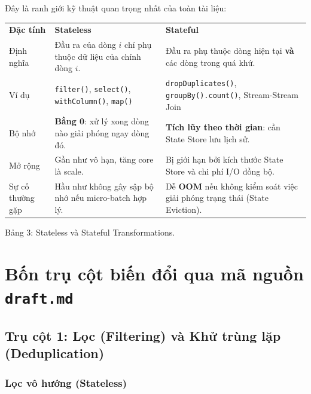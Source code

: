 \documentclass[12pt]{article}
\begin{document}
Đây là ranh giới kỹ thuật quan trọng nhất của toàn tài liệu:

\noindent
\begin{longtable}{@{}>{\RaggedRight\arraybackslash}p{2.8cm}>{\RaggedRight\arraybackslash}p{6.4cm}>{\RaggedRight\arraybackslash}p{6.4cm}@{}}
\rowcolor{rowLavender}
\textbf{Đặc tính} & \textbf{Stateless} & \textbf{Stateful} \\
\addlinespace[3pt]
\endhead
Định nghĩa & Đầu ra của dòng $i$ chỉ phụ thuộc dữ liệu của chính dòng $i$. & Đầu ra phụ thuộc dòng hiện tại \textbf{và} các dòng trong quá khứ. \\
\addlinespace[3pt]
Ví dụ & \texttt{filter()}, \texttt{select()}, \texttt{withColumn()}, \texttt{map()} & \texttt{dropDuplicates()}, \texttt{groupBy().count()}, Stream-Stream Join \\
\addlinespace[3pt]
Bộ nhớ & \textbf{Bằng 0}: xử lý xong dòng nào giải phóng ngay dòng đó. & \textbf{Tích lũy theo thời gian}: cần State Store lưu lịch sử. \\
\addlinespace[3pt]
Mở rộng & Gần như vô hạn, tăng core là scale. & Bị giới hạn bởi kích thước State Store và chi phí I/O đồng bộ. \\
\addlinespace[3pt]
Sự cố thường gặp & Hầu như không gây sập bộ nhớ nếu micro-batch hợp lý. & Dễ \textbf{OOM} nếu không kiểm soát việc giải phóng trạng thái (State Eviction). \\
\end{longtable}

\begin{captionbelowboxaivn}
Bảng 3: Stateless và Stateful Transformations.
\end{captionbelowboxaivn}

\section{Bốn trụ cột biến đổi qua mã nguồn \texttt{draft.md}}

\subsection{Trụ cột 1: Lọc (Filtering) và Khử trùng lặp (Deduplication)}

\subsubsection{Lọc vô hướng (Stateless)}
\end{document}
